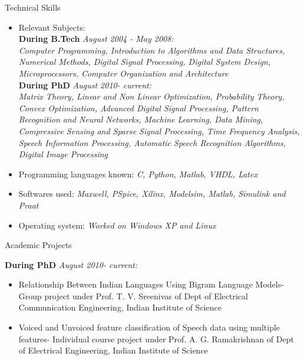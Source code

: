 \documentclass[10pt]{article}
\begin{document}
\begin{cv}
\begin{cvlist}{Technical Skills}
\item
\begin{itemize}\itemsep=0.25em
	\item Relevant Subjects:\\
	\textbf{During B.Tech}  \textit{August 2004 - May 2008:}\\
 \textit{Computer Programming, Introduction to Algorithms and Data Structures, Numerical Methods, Digital Signal Processing, Digital System Design,  Microprocessors,
Computer Organization and Architecture}\\
\textbf{During PhD} \textit{August 2010- current:}\\
\textit{Matrix Theory,
Linear and Non Linear Optimization, Probability Theory,  Convex Optimization,
Advanced Digital Signal Processing,
Pattern Recognition and Neural Networks, Machine Learning, Data Mining, Compressive Sensing and Sparse Signal Processing, Time Frequency Analysis, Speech Information Processing, Automatic Speech Recognition Algorithms, Digital Image Processing}



	\item Programming languages known:
 \textit{C, Python, Matlab, VHDL,  Latex}

\item Softwares used: \textit{Maxwell, PSpice, Xilinx, Modelsim, Matlab, Simulink and Praat}
\item Operating system: \textit{Worked on Windows XP and Linux}



	\end{itemize}

\end{cvlist}


\begin{cvlist}{Academic Projects}
\item \textbf{ During PhD} \textit{August 2010- current:}
\begin{itemize}\itemsep=0.25em
	\item
	Relationship Between Indian Languages Using Bigram Language Models- Group
project under Prof. T. V. Sreenivas of Dept of Electrical Communication Engineering,
Indian Institute of Science

\item
Voiced and Unvoiced feature classification of Speech data using multiple features-
Individual course project under Prof. A. G. Ramakrishnan of Dept of Electrical
Engineering, Indian Institute of Science


\end{itemize}
\end{cvlist}
\end{cv}
\end{document}
